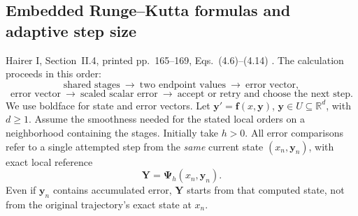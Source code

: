 \subsection{Embedded Runge--Kutta formulas and adaptive step size}
\label{sec:RKAdaptive}

Hairer I, Section~II.4, printed pp.~165--169, Eqs.~(4.6)--(4.14)
\cite{HNW1993}. The calculation proceeds in this order:
\[
 \text{shared stages}\ \longrightarrow\ \text{two endpoint values}
 \ \longrightarrow\ \text{error vector},
\]
\[
 \text{error vector}\ \longrightarrow\ \text{scaled scalar error}
 \ \longrightarrow\ \text{accept or retry and choose the next step}.
\]
We use boldface for state and error vectors. Let
$\mathbf y'=\mathbf f(x,\mathbf y)$, $\mathbf y\in U\subseteq\mathbb R^d$,
with $d\geq1$. Assume the smoothness needed for the stated local orders on a
neighborhood containing the stages. Initially take $h>0$. All error comparisons
refer to a single attempted step from the \emph{same} current state
$(x_n,\mathbf y_n)$, with exact local reference
\begin{equation}\label{Eq:AdaptLocalReference}
 \mathbf Y=\boldsymbol\Psi_h(x_n,\mathbf y_n).
\end{equation}
Even if $\mathbf y_n$ contains accumulated error, $\mathbf Y$ starts from that
computed state, not from the original trajectory's exact state at $x_n$.

